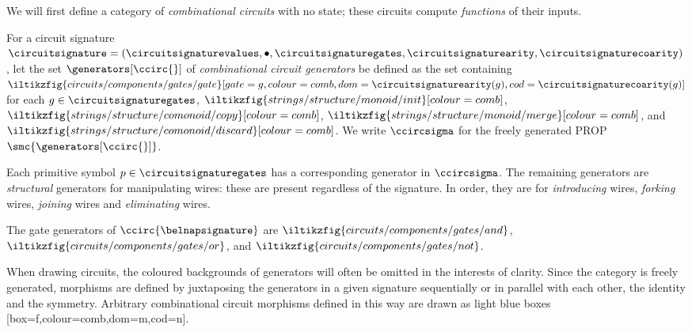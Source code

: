 \documentclass{lmcs}
\begin{document}
We will first define a category of \emph{combinational circuits} with no state;
these circuits compute \emph{functions} of their inputs.

\begin{defi}
    For a circuit signature \(
    \circuitsignature = (
    \circuitsignaturevalues,
    \bullet,
    \circuitsignaturegates,
    \circuitsignaturearity,
    \circuitsignaturecoarity
    )
    \), let the set \(\generators[\ccirc{}]\) of
    \emph{combinational circuit generators} be defined as the set containing \(
    \iltikzfig{circuits/components/gates/gate}[gate=g,colour=comb,dom=\circuitsignaturearity(g),cod=\circuitsignaturecoarity(g)]
    \) for each \(g \in \circuitsignaturegates\),
    \(\iltikzfig{strings/structure/monoid/init}[colour=comb]\),
    \(\iltikzfig{strings/structure/comonoid/copy}[colour=comb]\),
    \(\iltikzfig{strings/structure/monoid/merge}[colour=comb]\), and
    \(\iltikzfig{strings/structure/comonoid/discard}[colour=comb]\).
    We write \(\ccircsigma\) for the freely generated PROP
    \(\smc{\generators[\ccirc{}]}\).
\end{defi}

Each primitive symbol \(p \in \circuitsignaturegates\) has a corresponding
generator in \(\ccircsigma\).
The remaining generators are \emph{structural} generators
for manipulating
wires: these are present regardless of the signature.
In order, they are for \emph{introducing} wires, \emph{forking}
wires, \emph{joining} wires and \emph{eliminating} wires.

\begin{exa}
    The gate generators of \(\ccirc{\belnapsignature}\) are \(
    \iltikzfig{circuits/components/gates/and}
    \), \(
    \iltikzfig{circuits/components/gates/or}
    \), and \(
    \iltikzfig{circuits/components/gates/not}
    \).
\end{exa}

When drawing circuits, the coloured backgrounds of generators will often be
omitted in the interests of clarity.
Since the category is freely generated, morphisms are defined by
juxtaposing the generators in a given signature sequentially or in parallel with
each other, the identity and the symmetry.
Arbitrary combinational circuit morphisms defined in this way are drawn as light
blue boxes [box=f,colour=comb,dom=m,cod=n].
\end{document}
